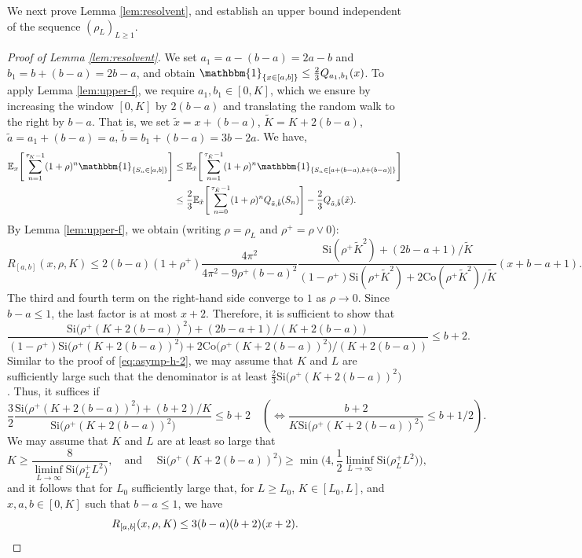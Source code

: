 \documentclass[a4paper, a4wide, 10pt, reqno]{amsart}
\theoremstyle{plain}
\theoremstyle{definition}
\numberwithin{equation}{section}
\newcommand{\E}{\mathbb E}
\newcommand{\Co}{{\mathrm{Co}}}
\newcommand{\Si}{{\mathrm{Si}}}
\newcommand{\ind}[1]{\mathbbm{1}_{\{#1\}}}
\begin{document}
We next prove Lemma \ref{lem:resolvent}, and establish an upper bound independent of the sequence $(\rho_L)_{L\ge 1}$.
\begin{proof}[Proof of Lemma \ref{lem:resolvent}]
We set $a_1=a-(b-a)=2a-b$ and $b_1=b+(b-a)=2b-a$, and obtain $\ind{x\in[a,b]}\le \tfrac{2}{3}Q_{a_1,b_1}(x)$. To apply Lemma \ref{lem:upper-f}, we require $a_1,b_1\in[0, K]$, which we ensure by increasing the window $[0, K]$ by $2(b-a)$ and translating the random walk to the right by $b-a$. That is, we set $\tilde x=x+(b-a)$, $\tilde K=K+2(b-a)$, $\tilde a=a_1+(b-a)=a$, $\tilde b=b_1+(b-a)=3b-2a$.  
        We have,
        \[
        \begin{aligned}
        \E_x\Bigg[\sum_{n=1}^{\tau_K-1}(1+\rho)^n\ind{S_n\in[a,b]}\Bigg] &\le \E_{\tilde x}\Bigg[\sum_{n=1}^{\tau_{\tilde K}-1}(1+\rho)^n\ind{S_n\in[a+(b-a),b+(b-a)]}\Bigg]\\
        &\le \frac{2}{3}\E_{\tilde x}\Bigg[\sum_{n=0}^{\tau_{\tilde K}-1}(1+\rho)^nQ_{\tilde a,\tilde b}(S_n)\Bigg] -\frac{2}{3}Q_{\tilde a,\tilde b}(\tilde x).
        \end{aligned}
        \]
By  Lemma \ref{lem:upper-f}, we obtain (writing $\rho = \rho_L$ and $\rho^+ = \rho \vee 0$):
\[R_{[a,b]}(x, \rho, K) \le 2(b-a)(1+\rho^+)\frac{4\pi^2}{4\pi^2-9\rho^+(b-a)^2}\frac{\Si(\rho^+ \tilde K^2)+(2b-a+1)/\tilde K}{(1-\rho^+)\Si(\rho^+ \tilde K^2)+2\Co(\rho^+ \tilde K^2)/\tilde K}(x+b-a+1).\]
The third and fourth term on the right-hand side converge to $1$ as $\rho\to 0$. Since $b-a\le 1$, the last factor is at most $x+2$. Therefore, it is sufficient to show that 
\[
\frac{\Si\big(\rho^+(K+2(b-a))^2\big)+(2b-a+1)/(K+2(b-a))}{(1-\rho^+)\Si\big(\rho^+(K+2(b-a))^2\big) + 2\Co\big(\rho^+(K+2(b-a))^2\big)/(K+2(b-a))}\le b+2.
\]
Similar to the proof of \eqref{eq:asymp-h-2}, we may assume that $K$ and $L$ are sufficiently large such that the denominator is at least $\frac23\Si\big(\rho^+(K+2(b-a))^2\big)$. Thus, it suffices if 
\[
\frac{3}{2}\frac{\Si\big(\rho^+(K+2(b-a))^2\big)+(b+2)/K}{\Si\big(\rho^+(K+2(b-a))^2\big)}\le b+2\quad \left(\Longleftrightarrow \frac{b+2}{K\Si\big(\rho^+(K+2(b-a))^2\big)}\le b+1/2\right).
\]
We may assume that $K$ and $L$ are at least so large that 
\[
K\ge \frac{8}{\liminf_{L\to\infty}\Si\big(\rho^+_LL^2\big)}, \quad\text{and }\quad \Si\big(\rho^+(K+2(b-a))^2\big) \ge \min\bigg(4, \frac{1}{2}\liminf_{L\to\infty}\Si\big(\rho^+_LL^2\big)\bigg),
\]
and it follows that for $L_0$ sufficiently large that, for $L\ge L_0$, $K\in[L_0, L]$, and $x,a,b\in[0, K]$ such that $b-a\le 1$, we have
\[R_{[a,b]}(x, \rho, K)\le 3(b-a)(b+2)(x+2). \qedhere\]
\end{proof}
\end{document}
